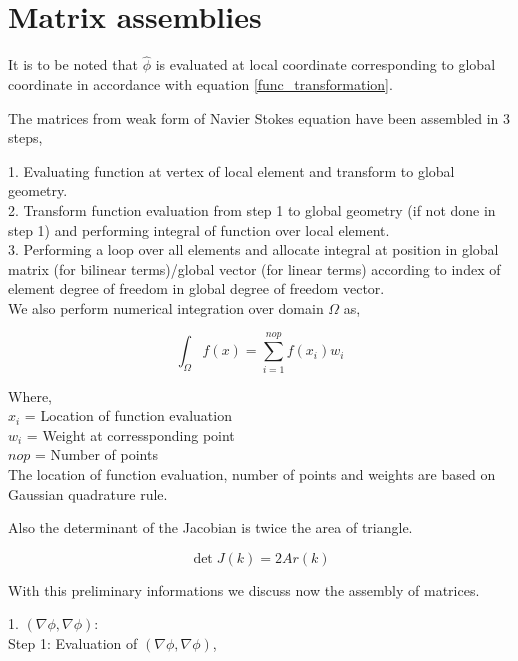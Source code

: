 \documentclass[a4paper]{book}
\begin{document}
\section{Matrix assemblies} \label{matrix_assembly_ch4}

It is to be noted that $\hat{\phi}$ is evaluated at local coordinate corresponding to global coordinate in accordance with equation \ref{func_transformation}.

The matrices from weak form of Navier Stokes equation have been assembled in 3 steps,

1. Evaluating function at vertex of local element and transform to global geometry.\\
2. Transform function evaluation from step 1 to global geometry (if not done in step 1) and performing integral of function over local element.\\
3. Performing a loop over all elements and allocate integral at position in global matrix (for bilinear terms)/global vector (for linear terms) according to index of element degree of freedom in global degree of freedom vector.\\

We also perform numerical integration over domain $\Omega$ as,

\begin{equation}\label{numerical integration}
\int_{\Omega} f(x) = \sum_{i=1}^{nop} f(x_i) w_i
\end{equation}

Where, \\

$x_i$ = Location of function evaluation\\
$w_i$ = Weight at corressponding point\\
$nop$ = Number of points\\

The location of function evaluation, number of points and weights are based on Gaussian quadrature rule.

Also the determinant of the Jacobian is twice the area of triangle.

\begin{equation}\label{determinant to area}
\det J(k) = 2Ar(k)
\end{equation}

With this preliminary informations we discuss now the assembly of matrices.

1. $(\nabla \phi, \nabla \phi)$:\\

Step 1: Evaluation of $(\nabla \phi , \nabla \phi)$,
\end{document}
